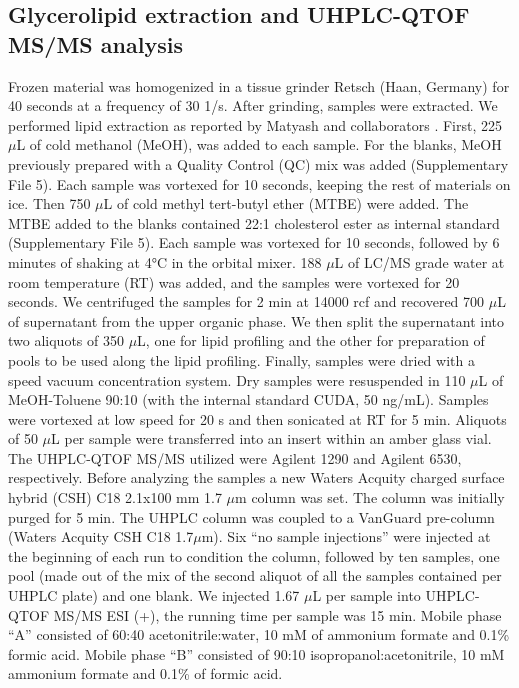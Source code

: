 \documentclass[9pt,twocolumn,twoside,lineno]{BioRxiv}
\begin{document}
\subsection{Glycerolipid extraction and UHPLC-QTOF MS/MS analysis} 
Frozen material was homogenized in a tissue grinder Retsch (Haan, Germany) for 40 seconds at a frequency of 30 1/s. After grinding, samples were extracted. 
We performed lipid extraction as reported by Matyash and collaborators \cite{Matyash2008-ue}. 
First, 225 $\mu$L of cold methanol (MeOH), was added to each sample. 
For the blanks, MeOH previously prepared with a Quality Control (QC) mix was added (Supplementary File 5). Each sample was vortexed for 10 seconds, keeping the rest of materials on ice. 
Then 750 $\mu$L of cold methyl tert-butyl ether (MTBE) were added. The MTBE added to the blanks contained 22:1 cholesterol ester as internal standard (Supplementary File 5). 
Each sample was vortexed for 10 seconds, followed by 6 minutes of shaking at 4°C in the orbital mixer. 
188 $\mu$L of LC/MS grade water at room temperature (RT) was added, and the samples were vortexed for 20 seconds.
We centrifuged the samples for 2 min at 14000 rcf and recovered 700 $\mu$L of supernatant from the upper organic phase. 
We then split the supernatant into two aliquots of 350 $\mu$L, one for lipid profiling and the other for preparation of pools to be used along the lipid profiling. 
Finally, samples were dried with a speed vacuum concentration system.
Dry samples were resuspended in 110 $\mu$L of MeOH-Toluene 90:10 (with the internal standard CUDA, 50 ng/mL). 
Samples were vortexed at low speed for 20 s and then sonicated at RT for 5 min. 
Aliquots of 50 $\mu$L per sample were transferred into an insert within an amber glass vial.
The UHPLC-QTOF MS/MS utilized were Agilent 1290 and Agilent 6530, respectively. 
Before analyzing the samples a new Waters Acquity charged surface hybrid (CSH) C18 2.1x100 mm 1.7 $\mu$m column was set. 
The column was initially purged for 5 min. 
The UHPLC column was coupled to a VanGuard pre-column (Waters Acquity CSH C18 1.7$\mu$m). 
Six “no sample injections” were injected at the beginning of each run to condition the column, followed by ten samples, one pool (made out of the mix of the second aliquot of all the samples contained per UHPLC plate) and one blank.
We injected 1.67 $\mu$L per sample into UHPLC-QTOF MS/MS ESI (+), the running time per sample was 15 min. Mobile phase “A” consisted of 60:40 acetonitrile:water, 10 mM of ammonium formate and 0.1\% formic acid. 
Mobile phase “B” consisted of 90:10 isopropanol:acetonitrile, 10 mM ammonium formate and 0.1\% of formic acid. 
\end{document}
